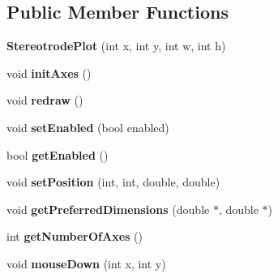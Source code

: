 \subsection*{Public Member Functions}
\begin{DoxyCompactItemize}
\item 
\hypertarget{classStereotrodePlot_a28f0041e93010dd5dad4c8e51a26cc6f}{{\bfseries Stereotrode\-Plot} (int x, int y, int w, int h)}\label{classStereotrodePlot_a28f0041e93010dd5dad4c8e51a26cc6f}

\item 
\hypertarget{classStereotrodePlot_ad5a5e70eecfddf9dd3d3de15ef76d792}{void {\bfseries init\-Axes} ()}\label{classStereotrodePlot_ad5a5e70eecfddf9dd3d3de15ef76d792}

\item 
\hypertarget{classStereotrodePlot_a0b3dd83ece8eb6e31f6e0311cf23da7e}{void {\bfseries redraw} ()}\label{classStereotrodePlot_a0b3dd83ece8eb6e31f6e0311cf23da7e}

\item 
\hypertarget{classStereotrodePlot_aad88b7592b8f3c44762ed37cf3751b90}{void {\bfseries set\-Enabled} (bool enabled)}\label{classStereotrodePlot_aad88b7592b8f3c44762ed37cf3751b90}

\item 
\hypertarget{classStereotrodePlot_a0f9acb82119a690dd7bc899af934ad99}{bool {\bfseries get\-Enabled} ()}\label{classStereotrodePlot_a0f9acb82119a690dd7bc899af934ad99}

\item 
\hypertarget{classStereotrodePlot_ade3c280e004b7fcb399d5e0b4da71c2f}{void {\bfseries set\-Position} (int, int, double, double)}\label{classStereotrodePlot_ade3c280e004b7fcb399d5e0b4da71c2f}

\item 
\hypertarget{classStereotrodePlot_ab459fad08156637d5e7f81e68d4f6e2b}{void {\bfseries get\-Preferred\-Dimensions} (double $\ast$, double $\ast$)}\label{classStereotrodePlot_ab459fad08156637d5e7f81e68d4f6e2b}

\item 
\hypertarget{classStereotrodePlot_a08ac5f1a8cb909590ac813f7b2cbb3bc}{int {\bfseries get\-Number\-Of\-Axes} ()}\label{classStereotrodePlot_a08ac5f1a8cb909590ac813f7b2cbb3bc}

\item 
\hypertarget{classStereotrodePlot_add199a472990150407c924c1f5f98a3d}{void {\bfseries mouse\-Down} (int x, int y)}\label{classStereotrodePlot_add199a472990150407c924c1f5f98a3d}


\end{DoxyCompactItemize}

